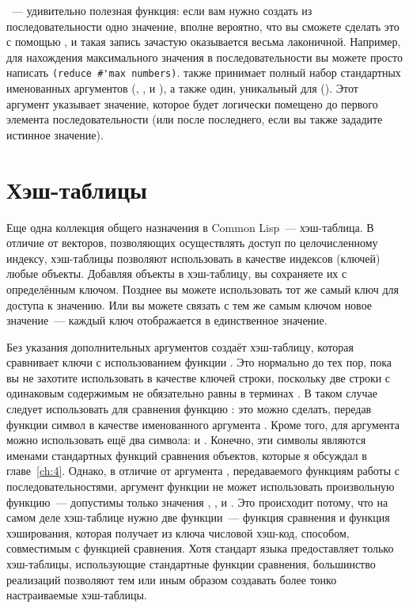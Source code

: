 ~--- удивительно полезная функция: если вам нужно создать из
последовательности одно значение, вполне вероятно, что вы сможете сделать это с помощью
, и такая запись зачастую оказывается весьма лаконичной.
Например, для нахождения максимального значения в последовательности вы можете просто
написать \lstinline!(reduce #'max numbers)!.  также принимает полный набор
стандартных именованных аргументов (, ,  и
), а также один, уникальный для  ().  Этот
аргумент указывает значение, которое будет логически помещено до первого элемента
последовательности (или после последнего, если вы также зададите  истинное
значение).

\section{Хэш-таблицы}

Еще одна коллекция общего назначения в Common Lisp~--- хэш-таблица.  В отличие от векторов,
позволяющих осуществлять доступ по целочисленному индексу,
хэш-таблицы позволяют использовать в качестве индексов (ключей) любые объекты.
Добавляя объекты в хэш-таблицу, вы сохраняете их с определённым ключом.  Позднее вы
можете использовать тот же самый ключ для доступа к значению.  Или вы можете связать
с тем же самым ключом новое значение~--- каждый ключ отображается в единственное значение.

Без указания дополнительных аргументов  создаёт хэш-таблицу, которая
сравнивает ключи с использованием функции .  Это нормально до тех пор, пока вы
не захотите использовать в качестве ключей строки, поскольку две строки с одинаковым
содержимым не обязательно равны в терминах .  В таком случае следует
использовать для сравнения функцию : это можно сделать, передав функции
 символ  в качестве именованного аргумента .
Кроме того, для аргумента  можно использовать ещё два символа:  и
.  Конечно, эти символы являются именами стандартных функций сравнения
объектов, которые я обсуждал в главе~\ref{ch:4}.  Однако, в отличие от аргумента ,
передаваемого функциям работы с последовательностями, аргумент  функции
 не может использовать произвольную функцию~--- допустимы только
значения , ,  и .  Это происходит потому, что
на самом деле хэш-таблице нужно две функции~--- функция сравнения и функция
хэширования, которая получает из ключа числовой хэш-код, способом, совместимым с
функцией сравнения.  Хотя стандарт языка предоставляет
только хэш-таблицы, использующие стандартные функции сравнения, большинство
реализаций позволяют тем или иным образом создавать более тонко настраиваемые
хэш-таблицы.

